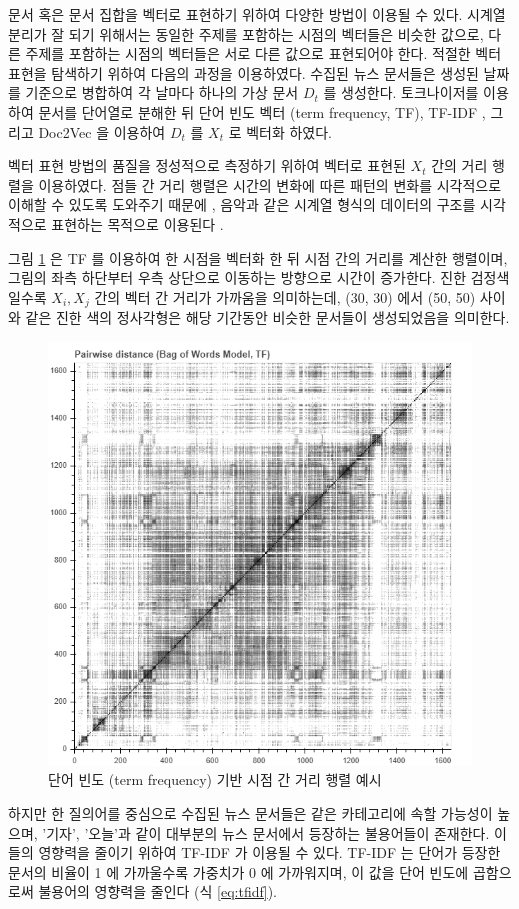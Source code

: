 \documentclass[oneside, ko,phd]{snuthesis_utf8_kor}
\begin{document}
문서 혹은 문서 집합을 벡터로 표현하기 위하여 다양한 방법이 이용될 수 있다.
시계열 분리가 잘 되기 위해서는 동일한 주제를 포함하는 시점의 벡터들은 비슷한 값으로, 다른 주제를 포함하는 시점의 벡터들은 서로 다른 값으로 표현되어야 한다.
적절한 벡터 표현을 탐색하기 위하여 다음의 과정을 이용하였다.
수집된 뉴스 문서들은 생성된 날짜를 기준으로 병합하여 각 날마다 하나의 가상 문서 $D_t$ 를 생성한다.
토크나이저를 이용하여 문서를 단어열로 분해한 뒤 단어 빈도 벡터 (term frequency, TF), TF-IDF \cite{sparck1972statistical}, 그리고 Doc2Vec \cite{le2014distributed} 을 이용하여 $D_t$ 를 $X_t$ 로 벡터화 하였다.

벡터 표현 방법의 품질을 정성적으로 측정하기 위하여 벡터로 표현된 $X_t$ 간의 거리 행렬을 이용하였다.
점들 간 거리 행렬은 시간의 변화에 따른 패턴의 변화를 시각적으로 이해할 수 있도록 도와주기 때문에 \cite{balasubramanyan2011block}, 음악과 같은 시계열 형식의 데이터의 구조를 시각적으로 표현하는 목적으로 이용된다 \cite{paulus2006music, paulus2010state, mcfee2014analyzing}.

그림 \ref{fig:timeseries_pairwise_tf} 은 TF 를 이용하여 한 시점을 벡터화 한 뒤 시점 간의 거리를 계산한 행렬이며, 그림의 좌측 하단부터 우측 상단으로 이동하는 방향으로 시간이 증가한다.
진한 검정색일수록 $X_i, X_j$ 간의 벡터 간 거리가 가까움을 의미하는데, (30, 30) 에서 (50, 50) 사이와 같은 진한 색의 정사각형은 해당 기간동안 비슷한 문서들이 생성되었음을 의미한다.

\begin{figure}[H]
\centering
\includegraphics[keepaspectratio=true, width=0.5\linewidth]{fig/timeseries_pairwise_tf.png}
\caption{단어 빈도 (term frequency) 기반 시점 간 거리 행렬 예시}
\label{fig:timeseries_pairwise_tf}
\end{figure}

하지만 한 질의어를 중심으로 수집된 뉴스 문서들은 같은 카테고리에 속할 가능성이 높으며, '기자', '오늘'과 같이 대부분의 뉴스 문서에서 등장하는 불용어들이 존재한다.
이들의 영향력을 줄이기 위하여 TF-IDF 가 이용될 수 있다.
TF-IDF 는 단어가 등장한 문서의 비율이 1 에 가까울수록 가중치가 0 에 가까워지며, 이 값을 단어 빈도에 곱함으로써 불용어의 영향력을 줄인다 (식 \ref{eq:tfidf}).
\end{document}
